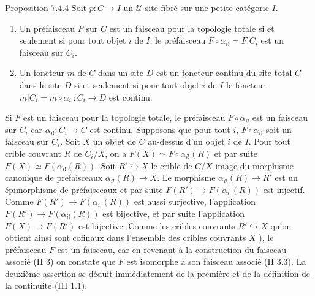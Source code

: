 \documentclass[10pt]{../fichiers-configuration-latex/smfart}
\begin{document}
\begin{enonce*}{Proposition 7.4.4}
Soit $p : C \to I$ un $𝒰$-site fibré sur une petite catégorie $I$.
\begin{enumerate}
\renewcommand{\labelenumi}{\theenumi)}
\item Un préfaisceau $F$ sur $C$ est un faisceau pour la topologie
  totale si et seulement si pour tout objet $i$ de $I$, le préfaisceau
  $F \circ \alpha_{i!} = F | C_i$ est un faisceau sur $C_i$.

\item Un foncteur $m$ de $C$ dans un site $D$ est un foncteur continu
  du site total $C$ dans le site $D$ si et seulement si pour tout
  objet $i$ de $I$ le foncteur $m | C_i = m \circ \alpha_{i!} : C_i
  \to D$ est continu.
\end{enumerate}
\end{enonce*}

Si $F$ est un faisceau pour la topologie totale, le préfaisceau $F
\circ \alpha_{i!}$ est un faisceau sur $C_i$ car $\alpha_{i!} : C_i
\to C$ est continu. Supposons que pour tout $i$, $F \circ
\alpha_{i!}$ soit un faisceau sur $C_i$. Soit $X$ un objet de $C$
au-dessus d'un objet $i$ de $I$. Pour tout crible couvrant $R$ de
$C_i /X$, on a $F(X) \simeq F \circ \alpha_{i!} (R)$ et par suite
$F(X) \simeq F(\alpha_{i!} (R))$. Soit $R' \hookrightarrow X$ le
crible de $C/X$ image du morphisme canonique de préfaisceaux
$\alpha_{i!} (R) \to X$. Le morphisme $\alpha_{i!} (R) \to R'$ est
un épimorphisme de préfaisceaux et par suite $F(R') \to
F(\alpha_{i!} (R))$ est injectif. Comme $F(R') \to F(\alpha_{i!}
(R))$ est aussi surjective, l'application $F(R') \to F(\alpha_{i!}
(R))$ est bijective, et par suite l'application $F(X) \to F(R')$ est
bijective. Comme les cribles couvrants $R' \hookrightarrow X$ qu'on obtient ainsi sont cofinaux dans l'ensemble des cribles couvrants $X$ ),
le préfaisceau $F$ est un faisceau, car en revenant à la
construction du faisceau associé (II 3) on constate que $F$ est
isomorphe à son faisceau associé (II 3.3). La deuxième assertion se
déduit immédiatement de la première et de la définition de la
continuité (III 1.1).

\setcounter{subsubsection}{4}
\subsubsection{}
\end{document}
